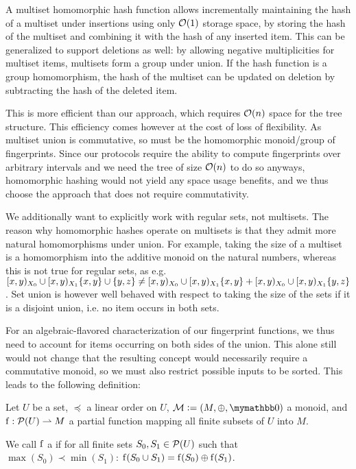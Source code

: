 A multiset homomorphic hash function allows incrementally maintaining the hash of a multiset under insertions using only $\mathcal{O}(1)$ storage space, by storing the hash of the multiset and combining it with the hash of any inserted item. This can be generalized to support deletions as well: by allowing negative multiplicities for multiset items, multisets form a group under union. If the hash function is a group homomorphism, the hash of the multiset can be updated on deletion by subtracting the hash of the deleted item.

This is more efficient than our approach, which requires $\mathcal{O}(n)$ space for the tree structure. This efficiency comes however at the cost of loss of flexibility. As multiset union is commutative, so must be the homomorphic monoid/group of fingerprints. Since our protocols require the ability to compute fingerprints over arbitrary intervals and we need the tree of size $\mathcal{O}(n)$ to do so anyways, homomorphic hashing would not yield any space usage benefits, and we thus choose the approach that does not require commutativity.

We additionally want to explicitly work with regular sets, not multisets. The reason why homomorphic hashes operate on multisets is that they admit more natural homomorphisms under union. For example, taking the size of a multiset is a homomorphism into the additive monoid on the natural numbers, whereas this is not true for regular sets, as e.g. $[{x},{y})_{X_0} \cup [{x},{y})_{X_1}{\{x, y\} \cup \{y, z\}} \neq [{x},{y})_{X_0} \cup [{x},{y})_{X_1}{\{x, y\}} + [{x},{y})_{X_0} \cup [{x},{y})_{X_1}{\{y, z\}}$. Set union is however well behaved with respect to taking the size of the sets if it is a disjoint union, i.e. no item occurs in both sets.

For an algebraic-flavored characterization of our fingerprint functions, we thus need to account for items occurring on both sides of the union. This alone still would not change that the resulting concept would necessarily require a commutative monoid, so we must also restrict possible inputs to be sorted. This leads to the following definition:

\begin{definition}
Let $U$ be a set, $\preceq$ a linear order on $U$, $\mathcal{M} \defeq (M, \groupaddsym, \neutraladd)$ a monoid, and ${\operatorname{f}}: {\mathcal{P}({U})} \rightharpoonup{M}$ a partial function mapping all finite subsets of $U$ into $M$.

We call $\operatorname{f}$ a  if for all finite sets $S_0, S_1 \in \mathcal{P}({U})$ such that $\max(S_0) \prec \min(S_1)$: $\operatorname{f}(S_0 \cup S_1) = {\operatorname{f}(S_0)} \oplus {\operatorname{f}(S_1)}$.
\end{definition}

